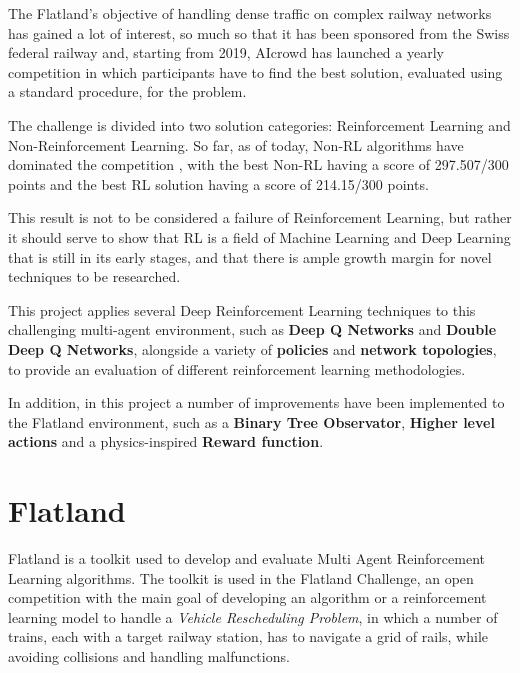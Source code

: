 \documentclass[13pt]{article}
\begin{document}
The Flatland's\cite{mohanty2020flatlandrl} objective of handling dense traffic on complex railway networks has gained a lot of interest, so much so that it has been sponsored from the Swiss federal railway and, starting from 2019, AIcrowd has launched a yearly competition in which participants have to find the best solution, evaluated using a standard procedure, for the problem.

The challenge is divided  into two solution categories: Reinforcement Learning and Non-Reinforcement Learning. So far, as of today, Non-RL algorithms have dominated the competition \cite{neurips2020winners}, with the best Non-RL having a score of 297.507/300 points and the best RL solution having a score of 214.15/300 points.

This result is not to be considered a failure of Reinforcement Learning, but rather it should serve to show that RL is a field of Machine Learning and Deep Learning that is still in its early stages, and that there is ample growth margin for novel techniques to be researched. 

This project applies several Deep Reinforcement Learning techniques to this challenging multi-agent environment, such as \textbf{Deep Q Networks} and \textbf{Double Deep Q Networks}, alongside a variety of \textbf{policies} and \textbf{network topologies}, to provide an evaluation of different reinforcement learning methodologies.

In addition, in this project a number of improvements have been implemented to the Flatland environment, such as a \textbf{Binary Tree Observator}, \textbf{Higher level actions} and a physics-inspired \textbf{Reward function}.

%
%

\newpage

%
%

\section{Flatland}
Flatland is a toolkit used to develop and evaluate Multi Agent Reinforcement Learning algorithms\cite{mohanty2020flatlandrl}. The toolkit is used in the Flatland Challenge, an open competition with the main goal of developing an algorithm or a reinforcement learning model to handle a \textit{Vehicle Rescheduling Problem}, in which a number of trains, each with a target railway station, has to navigate a grid of rails, while avoiding collisions and handling malfunctions. 
\end{document}
